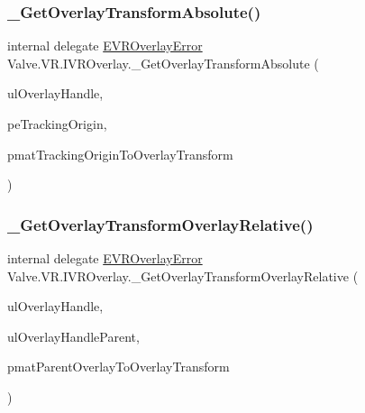 \subsubsection{\texorpdfstring{\_GetOverlayTransformAbsolute()}{\_GetOverlayTransformAbsolute()}}
{\footnotesize\ttfamily internal delegate \mbox{\hyperlink{namespace_valve_1_1_v_r_aaee5c5144f42b7969d45b854f51b0c18}{E\+V\+R\+Overlay\+Error}} Valve.\+V\+R.\+I\+V\+R\+Overlay.\+\_\+\+Get\+Overlay\+Transform\+Absolute (\begin{DoxyParamCaption}\item[{ulong}]{ul\+Overlay\+Handle,  }\item[{ref \mbox{\hyperlink{namespace_valve_1_1_v_r_a29be99a3c2f780157bd490db06a7f12f}{E\+Tracking\+Universe\+Origin}}}]{pe\+Tracking\+Origin,  }\item[{ref \mbox{\hyperlink{struct_valve_1_1_v_r_1_1_hmd_matrix34__t}{Hmd\+Matrix34\+\_\+t}}}]{pmat\+Tracking\+Origin\+To\+Overlay\+Transform }\end{DoxyParamCaption})}

\mbox{\label{struct_valve_1_1_v_r_1_1_i_v_r_overlay_a8cc0a138c05e5059bd41540d8f24800d}} 
\subsubsection{\texorpdfstring{\_GetOverlayTransformOverlayRelative()}{\_GetOverlayTransformOverlayRelative()}}
{\footnotesize\ttfamily internal delegate \mbox{\hyperlink{namespace_valve_1_1_v_r_aaee5c5144f42b7969d45b854f51b0c18}{E\+V\+R\+Overlay\+Error}} Valve.\+V\+R.\+I\+V\+R\+Overlay.\+\_\+\+Get\+Overlay\+Transform\+Overlay\+Relative (\begin{DoxyParamCaption}\item[{ulong}]{ul\+Overlay\+Handle,  }\item[{ref ulong}]{ul\+Overlay\+Handle\+Parent,  }\item[{ref \mbox{\hyperlink{struct_valve_1_1_v_r_1_1_hmd_matrix34__t}{Hmd\+Matrix34\+\_\+t}}}]{pmat\+Parent\+Overlay\+To\+Overlay\+Transform }\end{DoxyParamCaption})}

\mbox{\label{struct_valve_1_1_v_r_1_1_i_v_r_overlay_aec5e286ed41c5cad482f21b6be152433}} 
